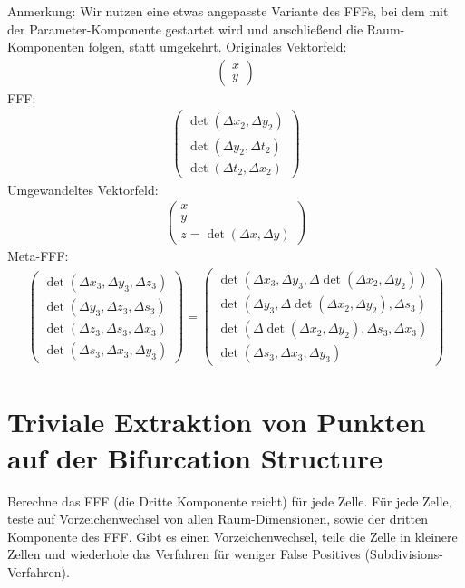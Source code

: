 \documentclass[11pt]{article}
\begin{document}
Anmerkung: Wir nutzen eine etwas angepasste Variante des FFFs, bei dem mit der Parameter-Komponente gestartet wird und anschließend die Raum-Komponenten folgen, statt umgekehrt. 
\newpage
Originales Vektorfeld:
\begin{align}
\begin{pmatrix}x\\y\end{pmatrix}
\end{align}
FFF:
\begin{align}
\begin{pmatrix}\det(\Delta x_2,\Delta y_2)\\\det(\Delta y_2,\Delta t_2)\\\det(\Delta t_2,\Delta x_2)\end{pmatrix}
\end{align}
Umgewandeltes Vektorfeld:
\begin{align}
\begin{pmatrix}x\\y\\z = \det(\Delta x,\Delta y)\end{pmatrix}
\end{align}
Meta-FFF:
\begin{align}
\begin{pmatrix}\det(\Delta x_3,\Delta y_3,\Delta z_3)\\\det(\Delta y_3,\Delta z_3,\Delta s_3)\\\det(\Delta z_3,\Delta s_3,\Delta x_3)\\\det(\Delta s_3,\Delta x_3,\Delta y_3)\end{pmatrix} =
\begin{pmatrix}\det(\Delta x_3,\Delta y_3,\Delta \det(\Delta x_2,\Delta y_2))\\\det(\Delta y_3,\Delta \det(\Delta x_2,\Delta y_2),\Delta s_3)\\\det(\Delta \det(\Delta x_2,\Delta y_2),\Delta s_3,\Delta x_3)\\\det(\Delta s_3,\Delta x_3,\Delta y_3)\end{pmatrix}
\end{align}





\section{Triviale Extraktion von Punkten auf der Bifurcation Structure}
Berechne das FFF (die Dritte Komponente reicht) für jede Zelle.
Für jede Zelle, teste auf Vorzeichenwechsel von allen Raum-Dimensionen, sowie der dritten Komponente des FFF. Gibt es einen Vorzeichenwechsel, teile die Zelle in kleinere Zellen und wiederhole das Verfahren für weniger False Positives (Subdivisions-Verfahren).
\end{document}
